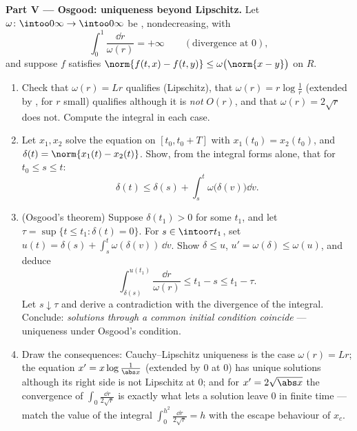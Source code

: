 \begin{problem}[{Weekend problem --- existence of solutions of
$x' = f(t, x)$ without Lipschitz}]
\medskip
\noindent\textbf{Part V --- Osgood: uniqueness beyond
Lipschitz.} Let $\omega\colon\intoo0\infty\to\intoo0\infty$ be
, nondecreasing, with
\[
\int_0^1\frac{\dd r}{\omega(r)} = +\infty
\qquad(\text{divergence at } 0),
\]
and suppose $f$ satisfies $\norm{f(t, x) - f(t, y)} \leq
\omega\bigl(\norm{x - y}\bigr)$ on $R$.
\begin{enumerate}[resume]
  \item Check that $\omega(r) = Lr$ qualifies (Lipschitz), that
        $\omega(r) = r\log\frac1r$ (extended by , for
        $r$ small) qualifies although it is \emph{not} $O(r)$,
        and that $\omega(r) = 2\sqrt r$ does not. Compute the
        integral in each case.
  \item Let $x_1, x_2$ solve the equation on $[t_0, t_0 + T]$
        with $x_1(t_0) = x_2(t_0)$, and $\delta(t) =
        \norm{x_1(t) - x_2(t)}$. Show, from the integral forms
        alone, that for $t_0 \leq s \leq t$:
        \[
        \delta(t) \leq \delta(s) +
        \int_s^t\omega\bigl(\delta(v)\bigr)\dd v .
        \]
  \item (Osgood's theorem) Suppose $\delta(t_1) > 0$ for some
        $t_1$, and let $\tau = \sup\{t \leq t_1 : \delta(t) =
        0\}$. For $s \in \intoo\tau{t_1}$, set $u(t) = \delta(s)
        + \int_s^t\omega(\delta(v))\,\dd v$. Show $\delta \leq
        u$, $u' = \omega(\delta) \leq \omega(u)$, and deduce
        \[
        \int_{\delta(s)}^{u(t_1)}\frac{\dd r}{\omega(r)}
        \leq t_1 - s \leq t_1 - \tau .
        \]
        Let $s \downarrow \tau$ and derive a contradiction with
        the divergence of the integral. Conclude:
        \emph{solutions through a common initial condition
        coincide} --- uniqueness under Osgood's condition.
  \item Draw the consequences: Cauchy--Lipschitz uniqueness is
        the case $\omega(r) = Lr$; the equation $x' =
        x\log\frac1{\abs x}$ (extended by $0$ at $0$) has unique
        solutions although its right side is not Lipschitz at
        $0$; and for $x' = 2\sqrt{\abs x}$ the convergence of
        $\int_0\frac{\dd r}{2\sqrt r}$ is exactly what lets a
        solution leave $0$ in finite time --- match the value of
        the integral $\int_0^{h^2}\frac{\dd r}{2\sqrt r} = h$
        with the escape behaviour of $x_c$.
\end{enumerate}


\end{problem}

